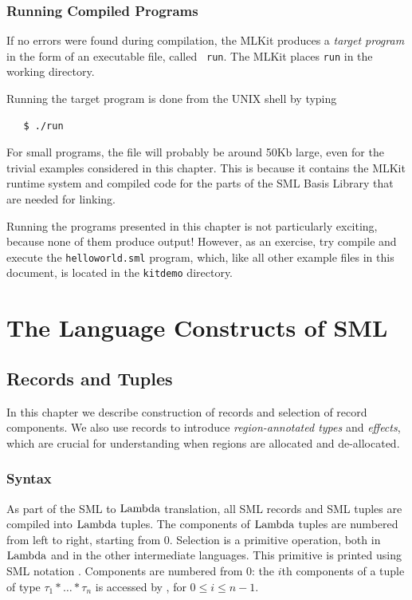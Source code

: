 \documentclass[12pt]{book}
\begin{document}
\section{Running Compiled Programs}
If no errors were found during compilation, the MLKit produces a
%
{\em target program} in the form of an executable file, called {\tt
  run}. The MLKit places {\tt run} in the working directory.

Running the target program is done from the UNIX shell by typing
%
\begin{verbatim}
   $ ./run
\end{verbatim}
For small programs, the file will probably be around 50Kb large, even
for the trivial examples considered in this chapter.  This is because
it contains the MLKit runtime system and compiled code for the parts of
the SML Basis Library that are needed for linking.

Running the programs presented in this chapter is not particularly
exciting, because none of them produce output! However, as an
exercise, try compile and execute the 
%
{\tt helloworld.sml} program, which, like all other example files in
this document, is located in the
%
{\tt kitdemo} directory.


\part{The Language Constructs of SML}
\label{understanding.sec}

\chapter{Records and Tuples}
\label{records.sec}
In this chapter we describe construction of 
%
records and selection of record components. We also use records to
introduce 
%
{\em region-annotated types} and 
%
{\em effects}, which are crucial for understanding when regions are
allocated and de-allocated.

\section{Syntax}
As part of the SML to 
%
$\hbox{\rm Lambda}$ translation, all SML records and SML tuples are compiled into
$\hbox{\rm Lambda}$ tuples. The components of $\hbox{\rm Lambda}$ tuples are numbered from left
to right, starting from 0.  Selection is a primitive operation, both
in $\hbox{\rm Lambda}$ and in the other intermediate languages. This primitive is
printed using SML notation . Components are numbered from
0: the $i$th components of a tuple of type
$\tau_1\ast\ldots\ast\tau_n$ is accessed by , for $0\leq
i\leq n-1$.
\end{document}
